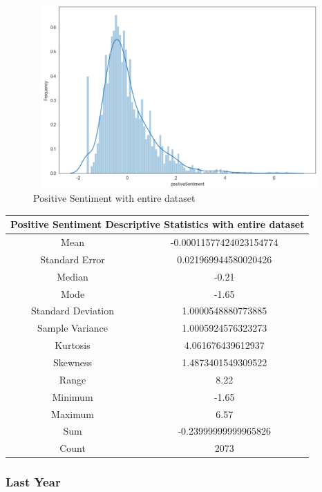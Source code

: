 \begin{figure}[h!]
    \centering
    \includegraphics[width=15cm,height=7cm,keepaspectratio]{resultsEvaluation/positiveDescMax.png}
    \caption{Positive Sentiment with entire dataset}
    \label{fig:appendix_positiveDescMax}
\end{figure}
\begin{center}
\begin{tabular}{ c c }
\hline
\multicolumn{2}{|c|}{Positive Sentiment Descriptive Statistics with entire dataset} \\
\hline
Mean & -0.00011577424023154774 \\
Standard Error & 0.021969944580020426 \\
Median & -0.21 \\
Mode & -1.65 \\
Standard Deviation & 1.0000548880773885 \\
Sample Variance & 1.0005924576323273 \\
Kurtosis & 4.061676439612937 \\
Skewness & 1.4873401549309522 \\
Range & 8.22 \\
Minimum & -1.65 \\
Maximum & 6.57 \\
Sum & -0.23999999999965826 \\
Count & 2073
\end{tabular}
\end{center}

\subsubsection{Last Year}

